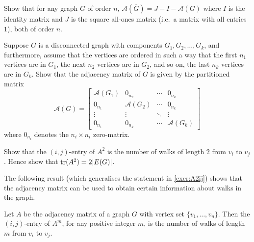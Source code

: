 \begin{Exercise}
Show that for any graph $G$ of order $n$, $\mathcal A(\overline G) = J - I - \mathcal A(G)$ where $I$ is the identity matrix and $J$ is the square all-ones matrix (i.e.\ a matrix with all entries $1$), both of order $n$.
\end{Exercise}

\begin{Exercise}
Suppose $G$ is a disconnected graph with components $G_1, G_2, \ldots, G_k$, and furthermore, assume that the vertices are ordered in such a way that the first $n_1$ vertices are in $G_1$, the next $n_2$ vertices are in $G_2$, and so on, the last $n_k$ vertices are in $G_k$. Show that the adjacency matrix of $G$ is given by the partitioned matrix
\begin{equation*}
\mathcal A(G) = \begin{bmatrix}
\mathcal A(G_1) & 0_{n_2} & \cdots & 0_{n_k} \\
0_{n_1} & \mathcal A(G_2) & \cdots & 0_{n_k} \\
\vdots & \vdots & \ddots & \vdots \\
0_{n_1} & 0_{n_k} & \cdots & \mathcal A(G_k)
\end{bmatrix}
\end{equation*}
where $0_{n_i}$ denotes the $n_i \times n_i$ zero-matrix.
\end{Exercise}

\begin{Exercise}\label{exer:A2ij}
Show that the $(i,j)$-entry of $A^2$ is the number of walks of length $2$ from $v_i$ to $v_j$. Hence show that $\trace(A^2) = 2|E(G)|$.\\
\end{Exercise}

The following result (which generalises the statement in \cref{exer:A2ij}) shows that the adjacency matrix can be used to obtain certain information about walks in the graph.

\begin{Theorem}
Let $A$ be the adjacency matrix of a graph $G$ with vertex set $\{v_1, \ldots, v_n\}$. Then the $(i,j)$-entry of $A^m$, for any positive integer $m$, is the number of walks of length $m$ from $v_i$ to $v_j$.
\end{Theorem}

